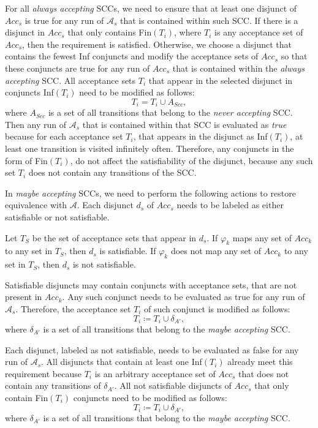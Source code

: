 \documentclass[
  digital, %
  twoside, %
  table,   %
  lof,     %
  lot,     %
]{fithesis3}
\begin{document}
For all \emph{always accepting} SCCs, we need to ensure that at least one disjunct of $Acc_s$ is true for any run of $\mathcal{A}_s$ that is contained within such SCC. If there is a disjunct in $Acc_s$ that only contains Fin$(T_i)$, where $T_i$ is any acceptance set of $Acc_s$, then the requirement is satisfied. Otherwise, we choose a disjunct that contains the fewest Inf conjuncts and modify the acceptance sets of $Acc_s$ so that these conjuncts are true for any run of $Acc_s$ that is contained within the \emph{always accepting} SCC. All acceptance sets $T_i$ that appear in the selected disjunct in conjuncts Inf$(T_i)$ need to be modified as follows:
\begin{equation*}
  T_i = T_i \cup A_{Scc},
\end{equation*}
where $A_{Scc}$ is a set of all transitions that belong to the \emph{never accepting} SCC. Then any run of $\mathcal{A}_s$ that is contained within that SCC is evaluated as \emph{true} because for each acceptance set $T_i$, that appears in the disjunct as Inf$(T_i)$, at least one transition is visited infinitely often. Therefore, any conjuncts in the form of Fin$(T_i)$, do not affect the satisfiability of the disjunct, because any such set $T_i$ does not contain any transitions of the SCC.

In \emph{maybe accepting} SCCs, we need to perform the following actions to restore equivalence with $\mathcal{A}$. Each disjunct $d_s$ of $Acc_s$ needs to be labeled as either satisfiable or not satisfiable.

Let $T_S$ be the set of acceptance sets that appear in $d_s$. If $\varphi_k$  maps any set of $Acc_k$ to any set in $T_S$, then $d_s$ is satisfiable. If $\varphi_k$  does not map any set of $Acc_k$ to any set in $T_S$, then $d_s$ is not satisfiable.

Satisfiable disjuncts may contain conjuncts with acceptance sets, that are not present in $Acc_k$. Any such conjunct needs to be evaluated as true for any run of $\mathcal{A}_s$. Therefore, the acceptance set $T_i$ of such conjunct is modified as follows:
\begin{equation*}
  T_i \coloneqq T_i \cup \delta_{A'},
\end{equation*}
where $\delta_{A'}$ is a set of all transitions that belong to the \emph{maybe accepting} SCC. 

Each disjunct, labeled as not satisfiable, needs to be evaluated as false for any run of $\mathcal{A}_s$. All disjuncts that contain at least one Inf$(T_i)$ already meet this requirement because $T_i$ is an arbitrary acceptance set of $Acc_s$ that does not contain any transitions of $\delta_{A'}$. All not satisfiable disjuncts of $Acc_s$ that only contain Fin$(T_i)$ conjuncts need to be modified as follows:
\begin{equation*}
  T_i \coloneqq T_i \cup \delta_{A'},
\end{equation*}
where $\delta_{A'}$ is a set of all transitions that belong to the \emph{maybe accepting} SCC. 
\end{document}
